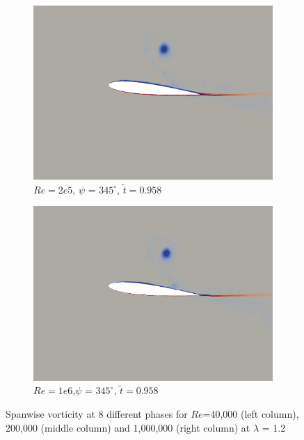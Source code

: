 \begin{figure}[H]
\begin{subfigure}[b]{0.32\textwidth}
		\includegraphics[width=1\textwidth]{figures/Vorticity_plots/Re_200k_1pt2/phase_345.png}
		\caption{$Re=2e5$, $\psi$ = $345^\circ$, $\tilde{t}=0.958$}
		\label{fig:Re_200k_1pt2_phi345}
	\end{subfigure}
	\begin{subfigure}[b]{0.32\textwidth}
		\centering
		\includegraphics[width=1\textwidth]{figures/Vorticity_plots/Re_1m_1pt2/phase_345.png}
		\caption{$Re=1e6$,$\psi$ = $345^\circ$, $\tilde{t}=0.958$}
		\label{fig:Re_1m_1pt2_phi345}
	\end{subfigure}
	
	\caption{Spanwise vorticity at 8 different phases for $Re$=40,000 (left column), 200,000 (middle column) and 1,000,000 (right column) at $\lambda$ = 1.2}
	\label{fig:vortScreen_1pt2}
\end{figure}


